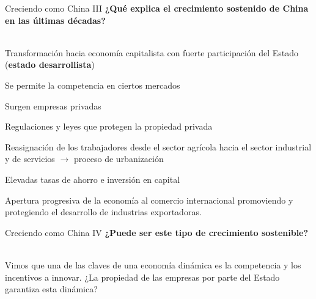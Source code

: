 \documentclass{beamer}
\let\tempone\itemize
\let\temptwo\enditemize
\renewenvironment{itemize}{\tempone\addtolength{\itemsep}{0.5\baselineskip}}{\temptwo}
\begin{document}
	\begin{frame}{Creciendo como China III}
			\textbf{¿Qué explica el crecimiento sostenido de China en las últimas décadas?}\\~\\
			\pause
			\begin{itemize}
				\item Transformación hacia economía capitalista con fuerte participación del Estado (\textbf{estado desarrollista})
				\begin{itemize}
					\item Se permite la competencia en ciertos mercados
					\item Surgen empresas privadas
					\item Regulaciones y leyes que protegen la propiedad privada
				\end{itemize}
				\item Reasignación de los trabajadores desde el sector agrícola hacia el sector industrial y de servicios $\rightarrow$ proceso de urbanización
				\item Elevadas tasas de ahorro e inversión en capital
				\item Apertura progresiva de la economía al comercio internacional promoviendo y protegiendo el desarrollo de industrias exportadoras.
			\end{itemize}
	\end{frame}

	\begin{frame}{Creciendo como China IV}
		\textbf{¿Puede ser este tipo de crecimiento sostenible?} \\~\\
		\pause
		\begin{itemize}
			\item Vimos que una de las claves de una economía dinámica es la competencia y los incentivos a innovar. ¿La propiedad de las empresas por parte del Estado garantiza esta dinámica?
		\end{itemize}
	\end{frame}
\end{document}
